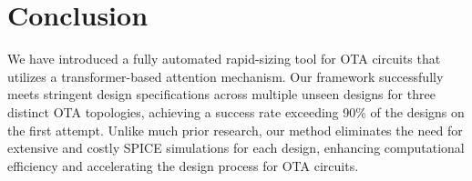 \section{Conclusion}
\label{sec:conclusion}

\noindent
We have introduced a fully automated rapid-sizing tool for OTA circuits that utilizes a transformer-based attention mechanism. Our framework successfully meets stringent design specifications across multiple unseen designs for three distinct OTA topologies, achieving a success rate exceeding 90\% of the designs on the first attempt. Unlike much prior research, our method eliminates the need for extensive and costly SPICE simulations for each design, enhancing computational efficiency and accelerating the design process for OTA circuits. 


